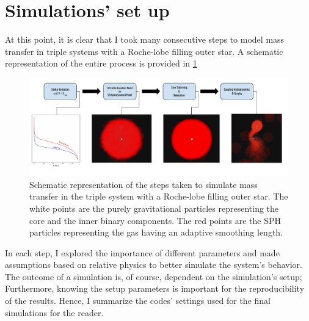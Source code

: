 \section{Simulations' set up}

At this point, it is clear that I took many consecutive steps to model mass transfer in triple systems with a Roche-lobe filling outer star. A schematic representation of the entire process is provided in \cref{fig:schematic_method}
\begin{figure}[H]
    \centering
    \includegraphics[width=\textwidth]{Thesis/figures/method_schematic.pdf}
    \caption{Schematic representation of the steps taken to simulate mass transfer in the triple system with a Roche-lobe filling outer star. The white points are the purely gravitational particles representing the core and the inner binary components. The red points are the SPH particles representing the gas having an adaptive smoothing length.}
    \label{fig:schematic_method}
\end{figure}
In each step, I explored the importance of different parameters and made assumptions based on relative physics to better simulate the system's behavior. The outcome of a simulation is, of course, dependent on the simulation's setup; Furthermore, knowing the setup parameters is important for the reproducibility of the results. Hence, I summarize the codes' settings used for the final simulations for the reader.
